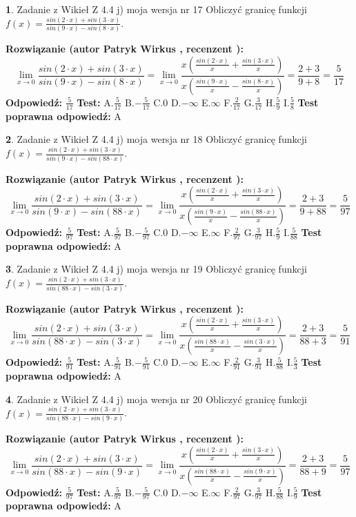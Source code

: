 \documentclass[12pt, a4paper]{article}
\theoremstyle{definition} %
\newtheorem{zad}{}
\newcommand{\zadStart}[1]{\begin{zad}#1\newline}
\newcommand{\zadStop}{\end{zad}}
\newcommand{\rozwStart}[2]{\noindent \textbf{Rozwiązanie (autor #1 , recenzent #2): }\newline}
\newcommand{\rozwStop}{\newline}
\newcommand{\odpStart}{\noindent \textbf{Odpowiedź:}\newline}
\newcommand{\odpStop}{\newline}
\newcommand{\testStart}{\noindent \textbf{Test:}\newline}
\newcommand{\testStop}{\newline}
\newcommand{\kluczStart}{\noindent \textbf{Test poprawna odpowiedź:}\newline}
\newcommand{\kluczStop}{\newline}
\begin{document}
\zadStart{Zadanie z Wikieł Z 4.4 j) moja wersja nr 17}
Obliczyć granicę funkcji $f(x)=\frac{sin(2\cdot x) +sin(3\cdot x)}{sin(9\cdot x) -sin(8\cdot x)}$.
\zadStop
\rozwStart{Patryk Wirkus}{}
$$\lim\limits_{x\to 0}\frac{sin(2\cdot x) +sin(3\cdot x)}{sin(9\cdot x) -sin(8\cdot x)}=\lim\limits_{x\to 0}\frac{x(\frac{sin(2\cdot x)}{x}+\frac{sin(3\cdot x)}{x})}{x(\frac{sin(9\cdot x)}{x}-\frac{sin(8\cdot x)}{x})}=\frac{2+3}{9+8} = \frac{5}{17}$$
\rozwStop
\odpStart
$\frac{5}{17}$
\odpStop
\testStart
A.$\frac{5}{17}$
B.$-\frac{5}{17}$
C.$0$
D.$-\infty$
E.$\infty$
F.$\frac{2}{17}$
G.$\frac{3}{17}$
H.$\frac{5}{9}$
I.$\frac{5}{8}$
\testStop
\kluczStart
A
\kluczStop



\zadStart{Zadanie z Wikieł Z 4.4 j) moja wersja nr 18}
Obliczyć granicę funkcji $f(x)=\frac{sin(2\cdot x) +sin(3\cdot x)}{sin(9\cdot x) -sin(88\cdot x)}$.
\zadStop
\rozwStart{Patryk Wirkus}{}
$$\lim\limits_{x\to 0}\frac{sin(2\cdot x) +sin(3\cdot x)}{sin(9\cdot x) -sin(88\cdot x)}=\lim\limits_{x\to 0}\frac{x(\frac{sin(2\cdot x)}{x}+\frac{sin(3\cdot x)}{x})}{x(\frac{sin(9\cdot x)}{x}-\frac{sin(88\cdot x)}{x})}=\frac{2+3}{9+88} = \frac{5}{97}$$
\rozwStop
\odpStart
$\frac{5}{97}$
\odpStop
\testStart
A.$\frac{5}{97}$
B.$-\frac{5}{97}$
C.$0$
D.$-\infty$
E.$\infty$
F.$\frac{2}{97}$
G.$\frac{3}{97}$
H.$\frac{5}{9}$
I.$\frac{5}{88}$
\testStop
\kluczStart
A
\kluczStop



\zadStart{Zadanie z Wikieł Z 4.4 j) moja wersja nr 19}
Obliczyć granicę funkcji $f(x)=\frac{sin(2\cdot x) +sin(3\cdot x)}{sin(88\cdot x) -sin(3\cdot x)}$.
\zadStop
\rozwStart{Patryk Wirkus}{}
$$\lim\limits_{x\to 0}\frac{sin(2\cdot x) +sin(3\cdot x)}{sin(88\cdot x) -sin(3\cdot x)}=\lim\limits_{x\to 0}\frac{x(\frac{sin(2\cdot x)}{x}+\frac{sin(3\cdot x)}{x})}{x(\frac{sin(88\cdot x)}{x}-\frac{sin(3\cdot x)}{x})}=\frac{2+3}{88+3} = \frac{5}{91}$$
\rozwStop
\odpStart
$\frac{5}{91}$
\odpStop
\testStart
A.$\frac{5}{91}$
B.$-\frac{5}{91}$
C.$0$
D.$-\infty$
E.$\infty$
F.$\frac{2}{91}$
G.$\frac{3}{91}$
H.$\frac{5}{88}$
I.$\frac{5}{3}$
\testStop
\kluczStart
A
\kluczStop



\zadStart{Zadanie z Wikieł Z 4.4 j) moja wersja nr 20}
Obliczyć granicę funkcji $f(x)=\frac{sin(2\cdot x) +sin(3\cdot x)}{sin(88\cdot x) -sin(9\cdot x)}$.
\zadStop
\rozwStart{Patryk Wirkus}{}
$$\lim\limits_{x\to 0}\frac{sin(2\cdot x) +sin(3\cdot x)}{sin(88\cdot x) -sin(9\cdot x)}=\lim\limits_{x\to 0}\frac{x(\frac{sin(2\cdot x)}{x}+\frac{sin(3\cdot x)}{x})}{x(\frac{sin(88\cdot x)}{x}-\frac{sin(9\cdot x)}{x})}=\frac{2+3}{88+9} = \frac{5}{97}$$
\rozwStop
\odpStart
$\frac{5}{97}$
\odpStop
\testStart
A.$\frac{5}{97}$
B.$-\frac{5}{97}$
C.$0$
D.$-\infty$
E.$\infty$
F.$\frac{2}{97}$
G.$\frac{3}{97}$
H.$\frac{5}{88}$
I.$\frac{5}{9}$
\testStop
\kluczStart
A
\kluczStop
\end{document}
